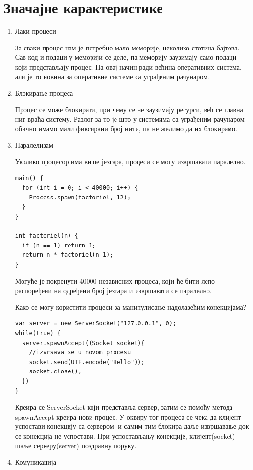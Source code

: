 \documentclass[12pt,oneside]{memoir}
\begin{document}
\section{Значајне карактеристике}
\begin{enumerate} 
\item Лаки процеси

За сваки процес нам је потребно мало меморије, неколико стотина бајтова. Сав код и подаци у меморији се деле, па меморију заузимају само подаци који представљају процес. На овај начин ради већина оперативних система, али је то новина за оперативне системе са уграђеним рачунаром.

\item Блокирање процеса

Процес се може блокирати, при чему се не заузимају ресурси, већ се главна нит враћа систему. Разлог за то је што у системима са уграђеним рачунаром обично имамо мали фиксирани број нити, па не желимо да их блокирамо. 

\item Паралелизам

Уколико процесор има више језгара, процеси се могу извршавати паралелно.

\begin{verbatim}
main() {
  for (int i = 0; i < 40000; i++) {
    Process.spawn(factoriel, 12);
  }
}

int factoriel(n) {
  if (n == 1) return 1;
  return n * factoriel(n-1);
}
\end{verbatim}
Могуће је покренути 40000 независних процеса, који ће бити лепо распоређени на одређени број језгара и извршавати се паралелно.

Како се могу користити процеси за манипулисање надолазећим конекцијама?

\begin{verbatim}
var server = new ServerSocket("127.0.0.1", 0);
while(true) {
  server.spawnAccept((Socket socket){
	//izvrsava se u novom procesu
	socket.send(UTF.encode("Hello"));
	socket.close();
  })
}
\end{verbatim}

Креира се ServerSocket који представља сервер, затим се помоћу метода spawnAccept креира нови процес. У оквиру тог процеса се чека да клијент успостави конекцију са сервером, и самим тим блокира даље извршавање док се конекција не успостави. При успостављању конекције, клијент(socket) шаље серверу(server) поздравну поруку.


\item Комуникација


\end{enumerate}
\end{document}
